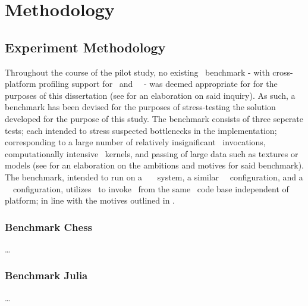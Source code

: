 
\chapter{Methodology}
\label{cha:methodology}


\section{Experiment Methodology}
\label{sec:methodology_experimentmethodology}
Throughout the course of the pilot study, no existing \dvttermopenglestwopointo\ benchmark - with cross-platform profiling support for \dvttermandroid\ and \dvttermxeleven\ \dvttermlinux\ - was deemed appropriate for for the purposes of this dissertation (see  for an elaboration on said inquiry).
As such, a benchmark has been devised for the purposes of stress-testing the solution developed for the purpose of this study.
The benchmark consists of three seperate tests; each intended to stress suspected bottlenecks in the implementation; corresponding to a large number of relatively insignificant \dvttermopengl\ invocations, computationally intensive \dvttermgpu\ kernels, and passing of large data such as textures or models (see  for an elaboration on the ambitions and motives for said benchmark).
The benchmark, intended to run on a \dvttermhost\ \dvttermfedora\ \dvttermlinux\ system, a similar \dvttermsimics\ \dvttermfedora\ configuration, and a \dvttermqemu\ \dvttermandroid\ configuration, utilizes \dvttermjni\ to invoke \dvttermopengles\ from the same \dvttermc\ code base independent of platform; in line with the motives outlined in .




\subsection{Benchmark Chess}
\label{sec:methodology_experimentmethodology_benchmarkchess}
\ldots

\subsection{Benchmark Julia}
\label{sec:methodology_experimentmethodology_benchmarkjulia}
\ldots


